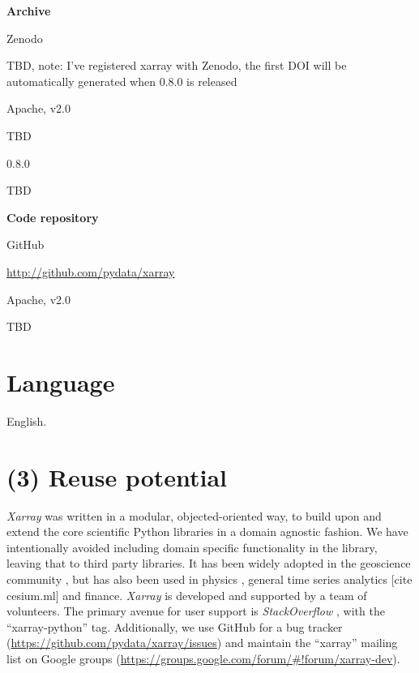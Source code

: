 \documentclass{jors}
\begin{document}
{\bf Archive}

\begin{description}[noitemsep,topsep=0pt]
	\item[Name:] Zenodo
	\item[Persistent identifier:] TBD, note: I've registered xarray with Zenodo, the first DOI will be automatically generated when 0.8.0 is released
	\item[Licence:] Apache, v2.0
	\item[Publisher:]  TBD
	\item[Version published:] 0.8.0
	\item[Date published:] TBD
\end{description}

{\bf Code repository}

\begin{description}[noitemsep,topsep=0pt]
	\item[Name:] GitHub
	\item[Persistent identifier:] \url{http://github.com/pydata/xarray}
	\item[Licence:] Apache, v2.0
	\item[Date published:] TBD
\end{description}

\section*{Language}

English.

\section*{(3) Reuse potential}

\textit{Xarray} was written in a modular, objected-oriented way, to build upon and extend the core scientific Python libraries in a domain agnostic fashion.
We have intentionally avoided including domain specific functionality in the library, leaving that to third party libraries.
It has been widely adopted in the geoscience community \citep[e.g.][]{Dawson_2016a,Dawson_2016b,xgcm}, but has also been used in physics \citep[e.g.][]{pycalphad}, general time series analytics [cite cesium.ml] and finance.
\textit{Xarray} is developed and supported by a team of volunteers. The primary avenue for user support is \textit{StackOverflow} \citep{stackoverflow}, with the ``xarray-python'' tag.
Additionally, we use GitHub for a bug tracker (\url{https://github.com/pydata/xarray/issues}) and maintain the ``xarray'' mailing list on Google groups (\url{https://groups.google.com/forum/#!forum/xarray-dev}).
\end{document}

